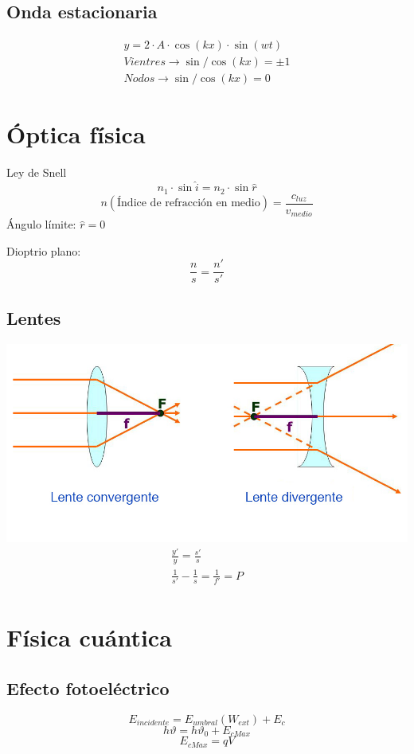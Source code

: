 \documentclass{article}
\begin{document}
\begin{multicols}{2}[]
\subsection{Onda estacionaria}
\begin{gather*}
  y=2\cdot A\cdot\cos(kx)\cdot\sin(wt) \\
  Vientres \rightarrow \sin/\cos(kx) = \pm1\\
  Nodos \rightarrow \sin/\cos(kx) = 0
\end{gather*}

\section{Óptica física}
Ley de Snell
\[n_1\cdot\sin\hat{i} = n_2\cdot\sin\hat{r}\]
\[n(\text{Índice de refracción en medio})=\frac{c_{luz}}{v_{medio}}\]
Ángulo límite: $\hat{r} = 0$

Dioptrio plano:
\[\frac{n}{s}=\frac{n\prime}{s\prime}\]

\subsection{Lentes}
\includegraphics[scale=0.30]{tipos_de_lentes}
\begin{gather*}
  \frac{y\prime}{y} = \frac{s\prime}{s} \\
  \frac{1}{s\prime} - \frac{1}{s} = \frac{1}{f\prime}=P\\
\end{gather*}


\vspace{-15px}
\section{Física cuántica}
\subsection{Efecto fotoeléctrico}
\[E_{incidente} = E_{umbral}(W_{ext})+E_c\]
\[h\vartheta=h\vartheta_0+E_{cMax}\]
\[E_{cMax}=qV\]


\end{multicols}
\end{document}

